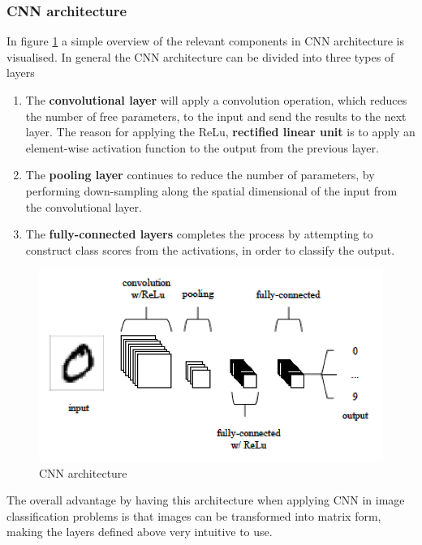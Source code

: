 \subsubsection{CNN architecture}
In figure \ref{fig:cnn} a simple overview of the relevant components in CNN architecture is visualised. In general the CNN architecture can be divided into three types of layers
\begin{enumerate}
    \item The \textbf{convolutional layer} will apply a convolution operation, which reduces the number of free parameters, to the input and send the results to the next layer. The reason for applying the ReLu, \textbf{rectified linear unit} is to apply an element-wise activation function to the output from the previous layer. 
    \item The \textbf{pooling layer} continues to reduce the number of parameters, by performing down-sampling along the spatial dimensional of the input from the convolutional layer. 
    \item The \textbf{fully-connected layers} completes the process by attempting to construct class scores from the activations, in order to classify the output. 
\end{enumerate}
\begin{figure}[H]
    \centering
    \includegraphics[width=0.7\linewidth]{images/chap2/CNN.png}
    \caption{CNN architecture \cite{Keiron}}
    \label{fig:cnn}
\end{figure}
The overall advantage by having this architecture when applying CNN in image classification problems is that images can be transformed into matrix form, making the layers defined above very intuitive to use. 
